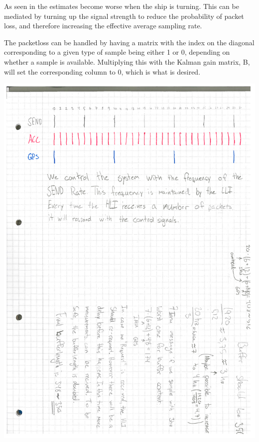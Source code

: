  As seen in  the estimates become worse when the ship is turning. This can be mediated by turning up the signal strength to reduce the probability of packet loss, and therefore increasing the effective average sampling rate. 

The packetloss can be handled by having a matrix with the index on the diagonal corresponding to a given type of sample being either 1 or 0, depending on whether a sample is available. Multiplying this with the Kalman gain matrix, B, will set the corresponding column to 0, which is what is desired.

\includegraphics[width = \textwidth]{simplex}
